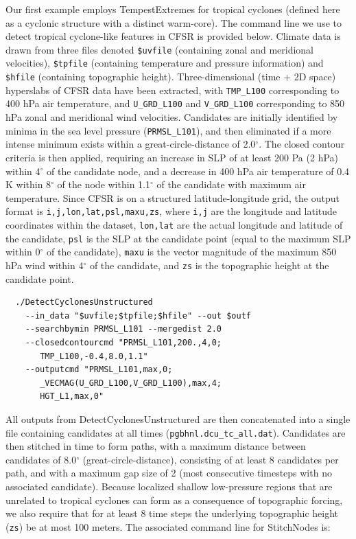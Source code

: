 \documentclass[gmdd, hvmath]{copernicus}
\begin{document}
Our first example employs TempestExtremes for tropical cyclones (defined here as a cyclonic structure with a distinct warm-core).  The command line we use to detect tropical cyclone-like features in CFSR is provided below.  Climate data is drawn from three files denoted \texttt{\$uvfile} (containing zonal and meridional velocities), \texttt{\$tpfile} (containing temperature and pressure information) and \texttt{\$hfile} (containing topographic height).  Three-dimensional (time + 2D space) hyperslabs of CFSR data have been extracted, with \texttt{TMP\_L100} corresponding to 400 hPa air temperature, and \texttt{U\_GRD\_L100} and \texttt{V\_GRD\_L100} corresponding to 850 hPa zonal and meridional wind velocities.  Candidates are initially identified by minima in the sea level pressure (\texttt{PRMSL\_L101}), and then eliminated if a more intense minimum exists within a great-circle-distance of 2.0$^\circ$.  The closed contour criteria is then applied, requiring an increase in SLP of at least 200 Pa (2 hPa) within 4$^\circ$ of the candidate node, and a decrease in 400 hPa air temperature of 0.4 K within 8$^\circ$ of the node within 1.1$^\circ$ of the candidate with maximum air temperature. Since CFSR is on a structured latitude-longitude grid, the output format is \texttt{i,j,lon,lat,psl,maxu,zs}, where \texttt{i,j} are the longitude and latitude coordinates within the dataset, \texttt{lon,lat} are the actual longitude and latitude of the candidate, \texttt{psl} is the SLP at the candidate point (equal to the maximum SLP within 0$^\circ$ of the candidate), \texttt{maxu} is the vector magnitude of the maximum 850 hPa wind within 4$^\circ$ of the candidate, and \texttt{zs} is the topographic height at the candidate point.

{\small \begin{verbatim}
  ./DetectCyclonesUnstructured
    --in_data "$uvfile;$tpfile;$hfile" --out $outf
    --searchbymin PRMSL_L101 --mergedist 2.0
    --closedcontourcmd "PRMSL_L101,200.,4,0;
       TMP_L100,-0.4,8.0,1.1"
    --outputcmd "PRMSL_L101,max,0;
       _VECMAG(U_GRD_L100,V_GRD_L100),max,4;
       HGT_L1,max,0"
\end{verbatim}}

All outputs from DetectCyclonesUnstructured are then concatenated into a single file containing candidates at all times (\texttt{pgbhnl.dcu\_tc\_all.dat}).  Candidates are then stitched in time to form paths, with a maximum distance between candidates of 8.0$^\circ$ (great-circle-distance), consisting of at least 8 candidates per path, and with a maximum gap size of 2 (most consecutive timesteps with no associated candidate).  Because localized shallow low-pressure regions that are unrelated to tropical cyclones can form as a consequence of topographic forcing, we also require that for at least 8 time steps the underlying topographic height (\texttt{zs}) be at most 100 meters.  The associated command line for StitchNodes is:
\end{document}
